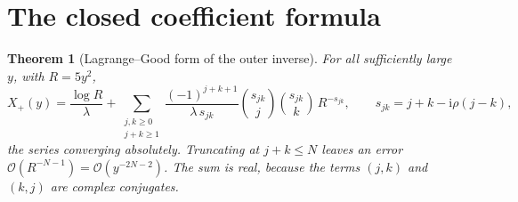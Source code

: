 \documentclass[11pt,a4paper,oneside]{book}
\theoremstyle{plain}
\newtheorem{theorem}{Theorem}[chapter]
\theoremstyle{definition}
\theoremstyle{remark}
\newcommand{\ii}{\mathrm{i}}
\newcommand{\bigO}{\mathcal{O}}
\begin{document}
\section{The closed coefficient formula}
\label{p9:sec:good}

\begin{theorem}[Lagrange--Good form of the outer inverse]\label{p9:thm:good}
For all sufficiently large $y$, with $R=5y^{2}$,
\begin{equation}\label{p9:eq:good}
 X_+(y)=\frac{\log R}{\lambda}
 +\sum_{\substack{j,k\ge0\\ j+k\ge1}}
 \frac{(-1)^{j+k+1}}{\lambda\,s_{jk}}
 \binom{s_{jk}}{j}\binom{s_{jk}}{k}\,R^{-s_{jk}},
 \qquad
 s_{jk}=j+k-\ii\rho(j-k),
\end{equation}
the series converging absolutely.  Truncating at $j+k\le N$ leaves an error
$\bigO(R^{-N-1})=\bigO(y^{-2N-2})$.  The sum is real, because the terms
$(j,k)$ and $(k,j)$ are complex conjugates.
\end{theorem}
\end{document}
